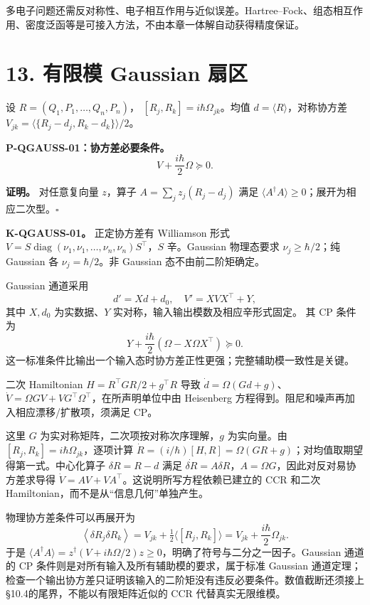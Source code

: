 \documentclass[
  11pt,
  oneside]{book}
\begin{document}
多电子问题还需反对称性、电子相互作用与近似误差。Hartree--Fock、组态相互作用、密度泛函等是可接入方法，不由本章一体解自动获得精度保证。

\hypertarget{ch-13}{%
\chapter{13. 有限模 Gaussian 扇区}\label{ch-13}}

设 \(R=(Q_1,P_1,\ldots,Q_n,P_n)\)，
\([R_j,R_k]=i\hbar\Omega_{jk}\)。均值 \(d=\langle R\rangle\)，对称协方差
\(V_{jk}=\langle\{R_j-d_j,R_k-d_k\}\rangle/2\)。

\protect\hypertarget{p-qgauss-01}{}{}

\textbf{P-QGAUSS-01：协方差必要条件。} \[
V+\frac{i\hbar}{2}\Omega\succeq0.
\]

\textbf{证明。} 对任意复向量 \(z\)，算子 \(A=\sum_jz_j(R_j-d_j)\) 满足
\(\langle A^\dagger A\rangle\ge0\)；展开为相应二次型。\(\square\)

\textbf{K-QGAUSS-01。} 正定协方差有 Williamson 形式
\(V=S\operatorname{diag}(\nu_1,\nu_1,\ldots,\nu_n,\nu_n)S^\top\)，\(S\)
辛。Gaussian 物理态要求 \(\nu_j\ge\hbar/2\)；纯 Gaussian 各
\(\nu_j=\hbar/2\)。非 Gaussian 态不由前二阶矩确定。

Gaussian 通道采用 \[
d'=Xd+d_0,\quad V'=XVX^\top+Y,
\] 其中 \(X,d_0\) 为实数据、\(Y\) 实对称，输入输出模数及相应辛形式固定。
其 CP 条件为 \[
Y+\frac{i\hbar}{2}(\Omega-X\Omega X^\top)\succeq0.
\]
这一标准条件比输出一个输入态时协方差正性更强；完整辅助模一致性是关键。

二次 Hamiltonian \(H=R^\top GR/2+g^\top R\) 导致
\(\dot d=\Omega(Gd+g)\)、\(\dot V=\Omega GV+VG^\top\Omega^\top\)，在所声明单位中由
Heisenberg 方程得到。阻尼和噪声再加入相应漂移/扩散项，须满足 CP。

这里 \(G\) 为实对称矩阵，二次项按对称次序理解，\(g\) 为实向量。由
\([R_j,R_k]=i\hbar\Omega_{jk}\)，逐项计算
\(\dot R=(i/\hbar)[H,R]=\Omega(GR+g)\)；对均值取期望得第一式。中心化算子
\(\delta R=R-d\) 满足
\(\dot{\delta R}=A\delta R\)，\(A=\Omega G\)，因此对反对易协方差求导得
\(\dot V=AV+VA^\top\)。这说明所写方程依赖已建立的 CCR 和二次
Hamiltonian，而不是从``信息几何''单独产生。

物理协方差条件可以再展开为 \[
\left\langle\delta R_j\delta R_k\right\rangle
=V_{jk}+\tfrac12\langle[R_j,R_k]\rangle
=V_{jk}+\frac{i\hbar}{2}\Omega_{jk}.
\] 于是
\(\langle A^\dagger A\rangle=z^\dagger(V+i\hbar\Omega/2)z\ge0\)，明确了符号与二分之一因子。Gaussian
通道的 CP 条件则是对所有输入及所有辅助模的要求，属于标准 Gaussian
通道定理；检查一个输出协方差只证明该输入的二阶矩没有违反必要条件。数值截断还须接上§10.4的尾界，不能以有限矩阵近似的
CCR 代替真实无限维模。
\end{document}

